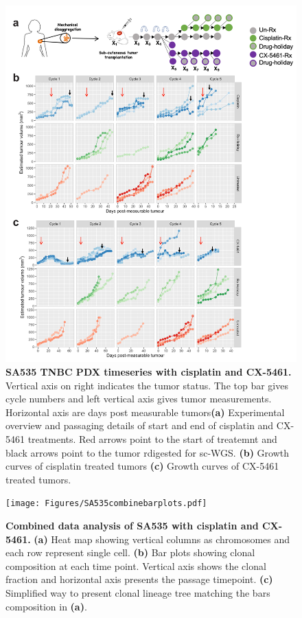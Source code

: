 \begin{figure}
\centering
\includegraphics[width=\textwidth]{Figures/SA535CX5461.pdf}
	
\caption[SA535 TNBC PDX timeseries with cisplatin and CX-5461]
	{\small
 \textbf{SA535 TNBC PDX timeseries with cisplatin and CX-5461.}
	    	Vertical axis on right indicates the tumor status. The top bar gives cycle numbers and left vertical axis gives tumor measurements. Horizontal axis are days post measurable tumors\textbf{(a)} Experimental overview and passaging details of start and end of cisplatin and CX-5461 treatments. Red arrows point to the start of treatemnt and black arrows point to the tumor rdigested for sc-WGS.
	   \textbf{(b)} Growth curves of cisplatin treated tumors
	    \textbf{(c)} Growth curves of CX-5461 treated tumors.
	}
	\label{fig:SA535CX5461}
\end{figure}




\begin{figure}
\centering
\texttt{[image: Figures/SA535combinebarplots.pdf]}
	
\caption[Combined data analysis of SA535 with cisplatin and CX-5461]
	{\small
	\textbf{Combined data analysis of SA535 with cisplatin and CX-5461.}
	   \textbf{(a)} Heat map showing vertical columns as chromosomes and each row represent single cell.
	    \textbf{(b)} Bar plots showing clonal composition at each time point. Vertical axis shows the clonal fraction   and horizontal axis presents the passage timepoint.
	     \textbf{(c)} Simplified way to present clonal lineage tree matching the bars composition in \textbf{(a)}.
	}
	\label{fig:SA535combinebarplots}
\end{figure}

